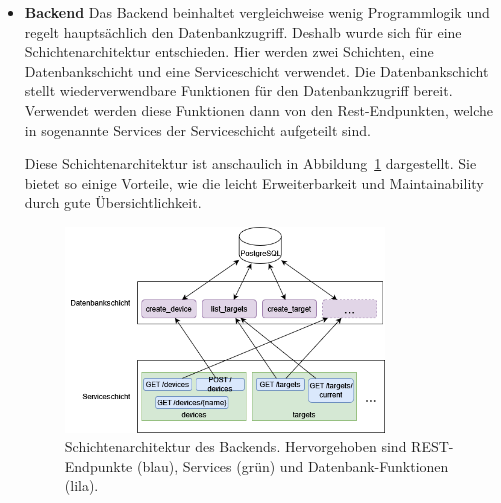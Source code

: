\begin{itemize}
            \item \textbf{Backend}
            Das Backend beinhaltet vergleichweise wenig Programmlogik und regelt hauptsächlich den Datenbankzugriff.
            Deshalb wurde sich für eine Schichtenarchitektur entschieden.
            Hier werden zwei Schichten, eine Datenbankschicht und eine Serviceschicht verwendet.
            Die Datenbankschicht stellt wiederverwendbare Funktionen für den Datenbankzugriff bereit.
            Verwendet werden diese Funktionen dann von den Rest-Endpunkten, welche in sogenannte Services der Serviceschicht aufgeteilt sind.

            Diese Schichtenarchitektur ist anschaulich in Abbildung~\ref{fig:design-backend-layer-architecture} dargestellt.
            Sie bietet so einige Vorteile, wie die leicht Erweiterbarkeit und Maintainability durch gute Übersichtlichkeit.
            \begin{figure}[h]
                \centering
                \includegraphics[width=0.8\textwidth]{images/backend-layer-architecture.drawio}
                \caption{Schichtenarchitektur des Backends. Hervorgehoben sind REST-Endpunkte (blau), Services (grün) und Datenbank-Funktionen (lila).}
                \label{fig:design-backend-layer-architecture}
            \end{figure}

        \end{itemize}


